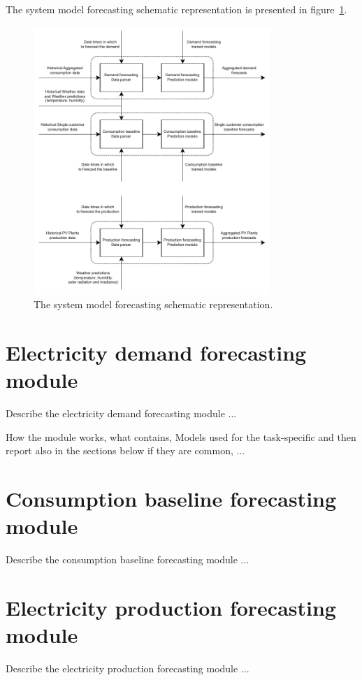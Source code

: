 The system model forecasting schematic representation is presented in figure~\ref{fig:modelforecasting}.

\begin{figure}[H]
\centering 
\includegraphics[width=0.8\textwidth]{images/system_model_forecasting}
\caption{The system model forecasting schematic representation.}
\label{fig:modelforecasting}
\end{figure}


\section{Electricity demand forecasting module}
\label{sec:demandmodel}
\vspace{0.2 cm}

Describe the electricity demand forecasting module ...

How the module works, what contains, Models used for the task-specific and then report also in the sections below if they are common, ...

\section{Consumption baseline forecasting module}
\label{sec:baselinemodel}
\vspace{0.2 cm}

Describe the consumption baseline forecasting module ...


\section{Electricity production forecasting module}
\label{sec:productionmodel}
\vspace{0.2 cm}

Describe the electricity production forecasting module ...
